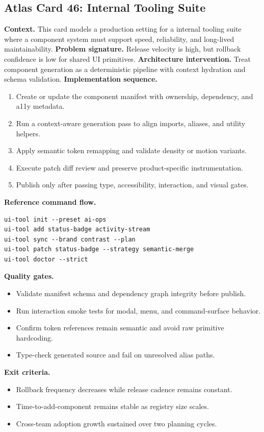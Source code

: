 \subsection*{Atlas Card 46: Internal Tooling Suite}
\textbf{Context.} This card models a production setting for a internal tooling suite where a component system must support speed, reliability, and long-lived maintainability.
\textbf{Problem signature.} Release velocity is high, but rollback confidence is low for shared UI primitives.
\textbf{Architecture intervention.} Treat component generation as a deterministic pipeline with context hydration and schema validation.
\textbf{Implementation sequence.}
\begin{enumerate}[leftmargin=*, itemsep=0.28em]
  \item Create or update the component manifest with ownership, dependency, and a11y metadata.
  \item Run a context-aware generation pass to align imports, aliases, and utility helpers.
  \item Apply semantic token remapping and validate density or motion variants.
  \item Execute patch diff review and preserve product-specific instrumentation.
  \item Publish only after passing type, accessibility, interaction, and visual gates.
\end{enumerate}
\textbf{Reference command flow.}
\begin{verbatim}
ui-tool init --preset ai-ops
ui-tool add status-badge activity-stream
ui-tool sync --brand contrast --plan
ui-tool patch status-badge --strategy semantic-merge
ui-tool doctor --strict
\end{verbatim}
\textbf{Quality gates.}
\begin{itemize}[leftmargin=*, itemsep=0.24em]
  \item Validate manifest schema and dependency graph integrity before publish.
  \item Run interaction smoke tests for modal, menu, and command-surface behavior.
  \item Confirm token references remain semantic and avoid raw primitive hardcoding.
  \item Type-check generated source and fail on unresolved alias paths.
\end{itemize}
\textbf{Exit criteria.}
\begin{itemize}[leftmargin=*, itemsep=0.24em]
  \item Rollback frequency decreases while release cadence remains constant.
  \item Time-to-add-component remains stable as registry size scales.
  \item Cross-team adoption growth sustained over two planning cycles.
\end{itemize}
\clearpage
